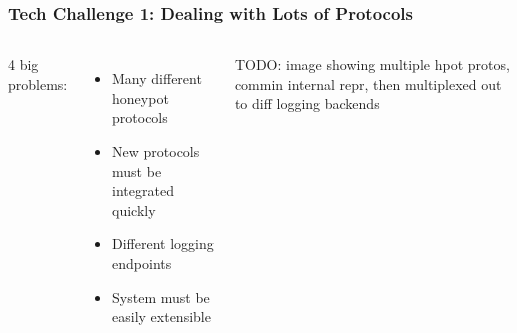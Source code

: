 \begin{frame}
\frametitle{Tech Challenge 1: Dealing with Lots of Protocols}


\begin{columns}[c]

4 big problems:

\begin{itemize}
    \item Many different honeypot protocols
    \item New protocols must be integrated quickly
    \item Different logging endpoints
    \item System must be easily extensible
\end{itemize}


TODO: image showing multiple hpot protos, commin internal repr, then
      multiplexed out to diff logging backends

\end{columns}

\end{frame}
